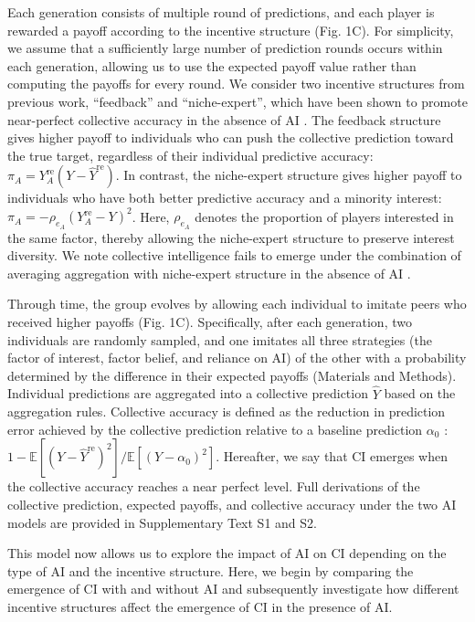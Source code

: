 \documentclass[12pt]{article}
\begin{document}
Each generation consists of multiple round of predictions, and each player is rewarded a payoff according to the incentive structure (Fig. 1C).
For simplicity, we assume that a sufficiently large number of prediction rounds occurs within each generation, allowing us to use the expected payoff value rather than computing the payoffs for every round.
We consider two incentive structures from previous work, ``feedback'' and ``niche-expert'', which have been shown to promote near-perfect collective accuracy in the absence of AI \citep{wang2025individual}.
The feedback structure gives higher payoff to individuals who can push the collective prediction toward the true target, regardless of their individual predictive accuracy: $\pi_A = Y_A^{\mathrm{re}}(Y-\hat{Y}^{\mathrm{re}})$.
In contrast, the niche-expert structure gives higher payoff to individuals who have both better predictive accuracy and a minority interest: $\pi_A = -\rho_{e_A}(Y_A^{\mathrm{re}}-Y)^2$.
Here, $\rho_{e_A}$ denotes the proportion of players interested in the same factor, thereby allowing the niche-expert structure to preserve interest diversity.
We note collective intelligence fails to emerge under the combination of averaging aggregation with niche-expert structure in the absence of AI \citep{wang2025individual}.

Through time, the group evolves by allowing each individual to imitate peers who received higher payoffs (Fig. 1C).
Specifically, after each generation, two individuals are randomly sampled, and one imitates all three strategies (the factor of interest, factor belief, and reliance on AI) of the other with a probability determined by the difference in their expected payoffs (Materials and Methods).
Individual predictions are aggregated into a collective prediction $\hat{Y}$ based on the aggregation rules.
Collective accuracy is defined as the reduction in prediction error achieved by the collective prediction relative to a baseline prediction $\alpha_0$ \citep{wang2025individual}: $1-\mathbb{E}[(Y-\hat{Y}^{\mathrm{re}})^2]/\mathbb{E}[(Y-\alpha_0)^2]$.
Hereafter, we say that CI emerges when the collective accuracy reaches a near perfect level.
Full derivations of the collective prediction, expected payoffs, and collective accuracy under the two AI models are provided in Supplementary Text S1 and S2.

This model now allows us to explore the impact of AI on CI depending on the type of AI and the incentive structure.
Here, we begin by comparing the emergence of CI with and without AI and subsequently investigate how different incentive structures affect the emergence of CI in the presence of AI.
\end{document}
